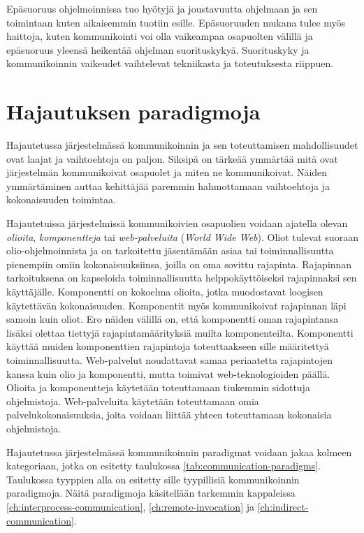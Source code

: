Epäsuoruus ohjelmoinnissa tuo hyötyjä ja joustavuutta ohjelmaan ja sen toimintaan kuten aikaisemmin tuotiin esille. Epäsuoruuden mukana tulee myös haittoja, kuten kommunikointi voi olla vaikeampaa osapuolten välillä ja epäsuoruus yleensä heikentää ohjelman suorituskykyä. Suorituskyky ja kommunikoinnin vaikeudet vaihtelevat tekniikasta ja toteutuksesta riippuen.

\section{Hajautuksen paradigmoja}
Hajautetussa järjestelmässä kommunikoinnin ja sen toteuttamisen mahdollisuudet ovat laajat ja vaihtoehtoja on paljon. Siksipä on tärkeää ymmärtää mitä ovat järjestelmän kommunikoivat osapuolet ja miten ne kommunikoivat. Näiden ymmärtäminen auttaa kehittäjää paremmin hahmottamaan vaihtoehtoja ja kokonaisuuden toimintaa.

Hajautetuissa järjestelmissä kommunikoivien osapuolien voidaan ajatella olevan \emph{olioita}, \emph{komponentteja} tai \emph{web-palveluita} (\emph{World Wide Web}). Oliot tulevat suoraan olio-ohjelmoinnista ja on tarkoitettu jäsentämään asiaa tai toiminnallisuutta pienempiin omiin kokonaisuuksiinsa, joilla on oma sovittu rajapinta. Rajapinnan tarkoituksena on kapseloida toiminnallisuutta helppokäyttöiseksi rajapinnaksi sen käyttäjälle. Komponentti on kokoelma olioita, jotka muodostavat loogisen käytettävän kokonaisuuden. Komponentit myös kommunikoivat rajapinnan läpi samoin kuin oliot. Ero näiden välillä on, että komponentti oman rajapintansa lisäksi olettaa tiettyjä rajapintamäärityksiä muilta komponenteilta. Komponentti käyttää muiden komponenttien rajapintoja toteuttaakseen sille määritettyä toiminnallisuutta. Web-palvelut noudattavat samaa periaatetta rajapintojen kanssa kuin olio ja komponentti, mutta toimivat web-teknologioiden päällä. Olioita ja komponentteja käytetään toteuttamaan tiukemmin sidottuja ohjelmistoja. Web-palveluita käytetään toteuttamaan omia palvelukokonaisuuksia, joita voidaan liittää yhteen toteuttamaan kokonaisia ohjelmistoja. \mbox{\cite[s.~42--43]{distributed-systems-concepts-and-design}}

Hajautetussa järjestelmässä kommunikoinnin paradigmat voidaan jakaa kolmeen kategoriaan, jotka on esitetty taulukossa \ref{tab:communication-paradigms}. Taulukossa tyyppien alla on esitetty sille tyypillisiä kommunikoinnin paradigmoja. Näitä paradigmoja käsitellään tarkemmin kappaleissa \ref{ch:interprocess-communication}, \ref{ch:remote-invocation} ja \ref{ch:indirect-communication}.

